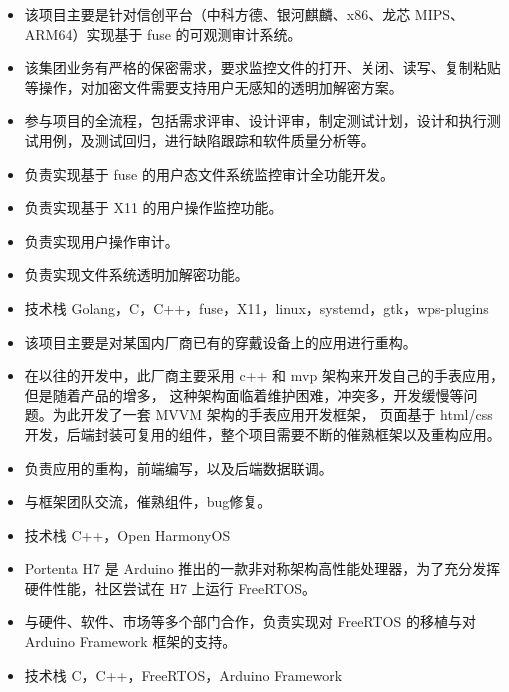 \documentclass{resume}
\begin{document}
\begin{itemize}
  \item 该项目主要是针对信创平台（中科方德、银河麒麟、x86、龙芯 MIPS、ARM64）实现基于 fuse 的可观测审计系统。
  \item 该集团业务有严格的保密需求，要求监控文件的打开、关闭、读写、复制粘贴等操作，对加密文件需要支持用户无感知的透明加解密方案。
  \item 参与项目的全流程，包括需求评审、设计评审，制定测试计划，设计和执行测试用例，及测试回归，进行缺陷跟踪和软件质量分析等。
  \item 负责实现基于 fuse 的用户态文件系统监控审计全功能开发。
  \item 负责实现基于 X11 的用户操作监控功能。
  \item 负责实现用户操作审计。
  \item 负责实现文件系统透明加解密功能。
  \item 技术栈 Golang，C，C++，fuse，X11，linux，systemd，gtk，wps-plugins
\end{itemize}

\begin{itemize}
  \item 该项目主要是对某国内厂商已有的穿戴设备上的应用进行重构。
  \item 在以往的开发中，此厂商主要采用 c++ 和 mvp 架构来开发自己的手表应用，但是随着产品的增多，
    这种架构面临着维护困难，冲突多，开发缓慢等问题。为此开发了一套 MVVM 架构的手表应用开发框架，
    页面基于 html/css 开发，后端封装可复用的组件，整个项目需要不断的催熟框架以及重构应用。
  \item 负责应用的重构，前端编写，以及后端数据联调。
  \item 与框架团队交流，催熟组件，bug修复。
  \item 技术栈 C++，Open HarmonyOS
\end{itemize}

\begin{itemize}
  \item Portenta H7 是 Arduino 推出的一款非对称架构高性能处理器，为了充分发挥硬件性能，社区尝试在 H7 上运行 FreeRTOS。
  \item 与硬件、软件、市场等多个部门合作，负责实现对 FreeRTOS 的移植与对 Arduino Framework 框架的支持。
  \item 技术栈 C，C++，FreeRTOS，Arduino Framework
\end{itemize}
\end{document}
